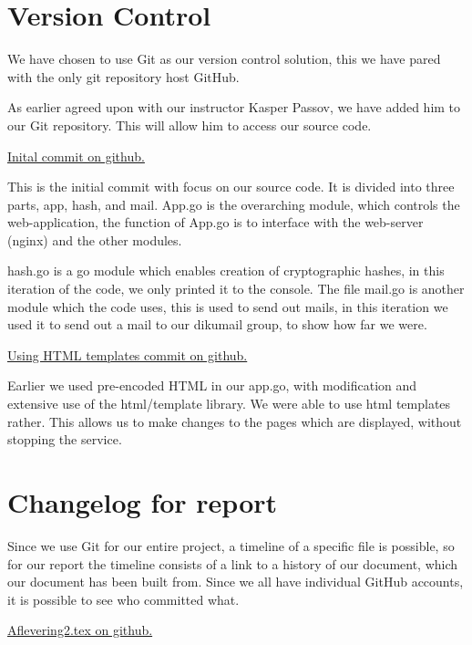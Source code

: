 \documentclass[11pt,a4paper]{report}
\begin{document}
\newpage
\begin{appendices}
\chapter{Version Control}

We have chosen to use Git as our version control solution, this we have pared with the only git repository host GitHub.

As earlier agreed upon with our instructor Kasper Passov, we have added him to our Git repository. This will allow him to access our source code.

\href{https://github.com/Orkeren/DIKU-Keyserver/commit/5e7c7c741fbe6d2e74889e8eaff6173e8c116d46}{Inital commit on github.}

This is the initial commit with focus on our source code. It is divided into three parts, app, hash, and mail. App.go is the overarching module, which controls the web-application, the function of App.go is to interface with the web-server (nginx) and the other modules.

hash.go is a go module which enables creation of cryptographic hashes, in this iteration of the code, we only printed it to the console.  The file mail.go is another module which the code uses, this is used to send out mails, in this iteration we used it to send out a mail to our dikumail group, to show how far we were.

\href{https://github.com/Orkeren/DIKU-Keyserver/commit/690f4b0b00dc68e9b529035d7e6e6a6005072d63}{Using HTML templates commit on github.}

Earlier we used pre-encoded HTML in our app.go, with modification and extensive use of the html/template library. We were able to use html templates rather. This allows us to make changes to the pages which are displayed, without stopping the service.

\chapter{Changelog for report}

Since we use Git for our entire project, a timeline of a specific file is possible, so for our report the timeline consists of a link to a history of our document, which our document has been built from. Since we all have individual GitHub accounts, it is possible to see who committed what.

\href{https://github.com/Orkeren/DIKU-Keyserver/commits/master/docs/delrapport_2/aflevering2.tex}{Aflevering2.tex on github.}



\end{appendices}
\end{document}
